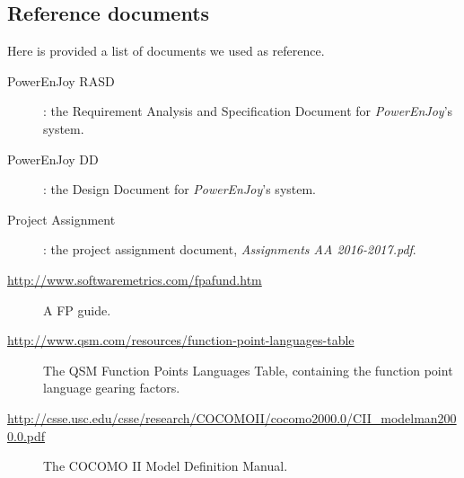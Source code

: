 \subsection{Reference documents}
\label{sec:references}
	Here is provided a list of documents we used as reference.
	\begin{description}
		\item[PowerEnJoy RASD]: the Requirement Analysis and Specification Document for \textit{PowerEnJoy}'s system.
		\item[PowerEnJoy DD]: the Design Document for \textit{PowerEnJoy}'s system.
		\item[Project Assignment]: the project assignment document, \textit{Assignments AA 2016-2017.pdf}.
		\item[\url{http://www.softwaremetrics.com/fpafund.htm}] A FP guide.
		\item[\url{http://www.qsm.com/resources/function-point-languages-table}] The QSM Function Points Languages Table, containing the function point language gearing factors.
		\item[\url{http://csse.usc.edu/csse/research/COCOMOII/cocomo2000.0/CII\_modelman2000.0.pdf}] The COCOMO II Model Definition Manual.
	\end{description}
